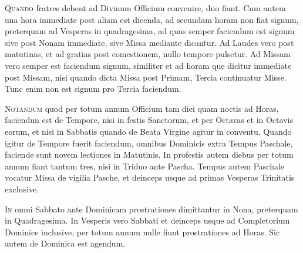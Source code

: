 
\thispagestyle{fancy}

\vspace{+10pt}
\color{Red}\color{black}

\begin{multicols*}{2}



{\color{Red} }
\lettrine[lines=4]{\zallmancaps \color{Blue} Q}{uando} fratres debent ad Divinum Officium convenire, duo fiant. Cum autem una hora immediate post aliam est dicenda, ad secundam horam non fiat signum, preterquam ad Vesperas in quadragesima, ad quas semper faciendum est signum sive post Nonam immediate, sive Missa mediante dicantur.
Ad Laudes vero post matutinas, et ad gratias post comestionem, nullo tempore pulsetur.
Ad Missam vero semper est faciendum signum, similiter et ad horam que dicitur immediate post Missam, nisi quando dicta Missa post Primam, Tercia continuatur Misse. Tunc enim non est signum pro Tercia faciendum.

{\color{Red} }
\lettrine[lines=2]{\zallmancaps \color{Red} N}{otandum} quod per totum annum Officium tam diei quam noctis ad Horas, faciendun est de Tempore, nisi in festis Sanctorum, et per Octavas et in Octavis eorum, et nisi in Sabbatis quando de Beata Virgine agitur in conventu.
Quando igitur de Tempore fuerit faciendum, omnibus Dominicis extra Tempus Paschale, faciende sunt novem lectiones in Matutinis. In profestis autem diebus per totum annum fiant tantum tres, nisi in Triduo ante Pascha. Tempus autem Paschale vocatur Missa de vigilia Pasche, et deinceps usque ad primas Vesperas Trinitatis exclusive.

{\color{Red} }
\lettrine[lines=2]{\zallmancaps \color{Blue} I}{n} omni Sabbato ante Dominicam prostrationes dimittantur in Nona, preterquam in Quadragesima. In Vesperis vero Sabbati et deinceps usque ad Completorium Dominice inclusive, per totum annum nulle fiunt prostrationes ad Horas. Sic autem de Dominica est agendum.


\end{multicols*}
